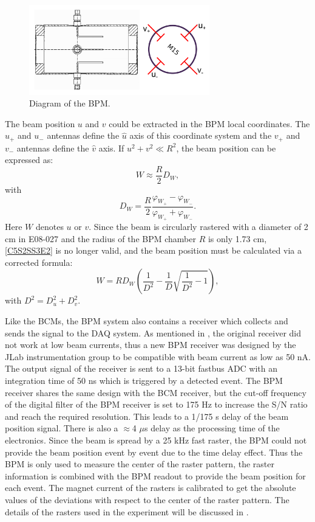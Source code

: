 \begin{figure}[b!]
  \centering
  \includegraphics[width=0.7\textwidth]{figs/bpm-design.png}
  \caption[Diagram of the BPM.]{Diagram of the BPM. \label{C5S2SS3F1}}
\end{figure}

The beam position $u$ and $v$ could be extracted in the BPM local coordinates. The $u_+$ and $u_-$ antennas define the $\hat{u}$ axis of this coordinate system and the $v_+$ and $v_-$ antennas define the $\hat{v}$ axis. If $u^2+v^2\ll R^2$, the beam position can be expressed as:
\begin{equation} \label{C5S2SS3E2}
W \approx \frac{R}{2}D_W,
\end{equation}
with
\begin{equation} \label{C5S2SS3E3}
D_W= \frac{R}{2}\frac{\varphi_{W_+}-\varphi_{W_-}}{\varphi_{W_+}+\varphi_{W_-}}.
\end{equation}
Here $W$ denotes $u$ or $v$. Since the beam is circularly rastered with a diameter of 2 cm in E08-027 and the radius of the BPM chamber $R$ is only 1.73 cm, \cref{C5S2SS3E2} is no longer valid, and the beam position must be calculated via a corrected formula:
\begin{equation} \label{C5S2SS3E4}
W = RD_W\left(\frac{1}{D^2}-\frac{1}{D}\sqrt{\frac{1}{D^2}-1}\right),
\end{equation}
with $D^2=D_u^2+D_v^2$.

Like the BCMs, the BPM system also contains a receiver which collects and sends the signal to the DAQ system. As mentioned in , the original receiver did not work at low beam currents, thus a new BPM receiver was designed by the JLab instrumentation group \cite{Musson2012} to be compatible with beam current as low as 50 nA. The output signal of the receiver is sent to a 13-bit fastbus ADC with an integration time of 50 ns which is triggered by a detected event. The BPM receiver shares the same design with the BCM receiver, but the cut-off frequency of the digital filter of the BPM receiver is set to 175 Hz to increase the S/N ratio and reach the required resolution. This leads to a 1/175 s delay of the beam position signal. There is also a $\approx$4 $\mu$s delay as the processing time of the electronics. Since the beam is spread by a 25 kHz fast raster, the BPM could not provide the beam position event by event due to the time delay effect. Thus the BPM is only used to measure the center of the raster pattern, the raster information is combined with the BPM readout to provide the beam position for each event. The magnet current of the rasters is calibrated to get the absolute values of the deviations with respect to the center of the raster pattern. The details of the rasters used in the experiment will be discussed in .

